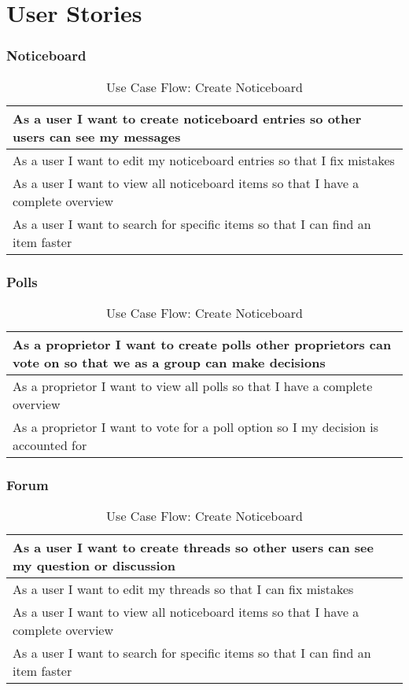 \chapter{User Stories}
\subsection{Noticeboard}
\begin{table}[H]
    \begin{tabularx}{\linewidth}{|X|}
      \hline
        As a user I want to create noticeboard entries so other users can see my messages \\
       \hline
        As a user I want to edit my noticeboard entries so that I fix mistakes \\
       \hline
        As a user I want to view all noticeboard items so that I have a complete overview \\
       \hline
        As a user I want to search for specific items so that I can find an item faster \\
       \hline 
    \end{tabularx}
    \caption{Use Case Flow: Create Noticeboard}
  \end{table}

\subsection{Polls}
\begin{table}[H]
  \begin{tabularx}{\linewidth}{|X|}
    \hline
      As a proprietor I want to create polls other proprietors can vote on so that we as a group can make decisions \\
     \hline
      As a proprietor I want to view all polls so that I have a complete overview \\
     \hline
      As a proprietor I want to vote for a poll option so I my decision is accounted for \\
     \hline 
  \end{tabularx}
  \caption{Use Case Flow: Create Noticeboard}
\end{table}

\subsection{Forum}
\begin{table}[H]
  \begin{tabularx}{\linewidth}{|X|}
    \hline
      As a user I want to create threads so other users can see my question or discussion \\
     \hline
      As a user I want to edit my threads  so that I can fix mistakes \\
     \hline
      As a user I want to view all noticeboard items so that I have a complete overview \\
     \hline
      As a user I want to search for specific items so that I can find an item faster \\
     \hline 
  \end{tabularx}
  \caption{Use Case Flow: Create Noticeboard}
\end{table}


